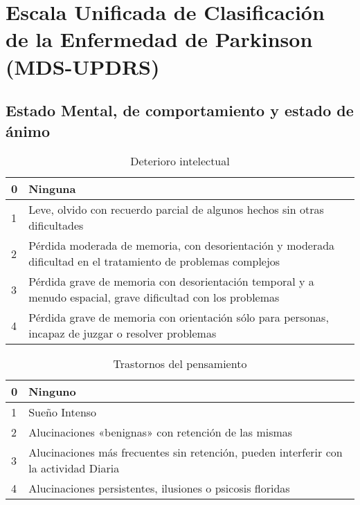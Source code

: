 \chapter{Escala Unificada de Clasificación de la Enfermedad de Parkinson (MDS-UPDRS) \cite{MDS-UPDRS2008}}\label{appendix:MDS-UPDRS}

\section{Estado Mental, de comportamiento y estado de ánimo}

\begin{table}[H]
\begin{center}
\begin{tabular}{|p{1cm}|p{11cm}|}
\hline
0 & Ninguna \\\hline
1 & Leve, olvido con recuerdo parcial de algunos hechos sin otras dificultades \\\hline
2 & Pérdida moderada de memoria, con desorientación y moderada dificultad en el tratamiento de problemas complejos \\\hline
3 & Pérdida grave de memoria con desorientación temporal y a menudo espacial, grave dificultad con los problemas \\\hline
4 & Pérdida grave de memoria con orientación sólo para personas, incapaz de juzgar o resolver problemas\\\hline
\end{tabular}
\caption{Deterioro intelectual}
\end{center}
\end{table}

\begin{table}[H]
\begin{center}
\begin{tabular}{|p{1cm}|p{11cm}|}
\hline
0 & Ninguno \\\hline
1 & Sueño Intenso\\\hline
2 & Alucinaciones «benignas» con retención de las mismas \\\hline
3 & Alucinaciones más frecuentes sin retención, pueden interferir con la actividad Diaria \\\hline
4 & Alucinaciones persistentes, ilusiones o psicosis floridas\\\hline
\end{tabular}
\caption{Trastornos del pensamiento}
\end{center}
\end{table}

